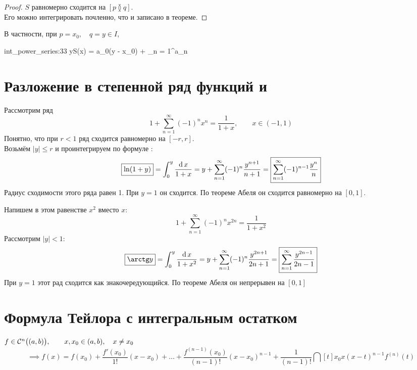 \begin{proof}
	$ S $ равномерно сходится на $ [p \between q] $. \\
	Его можно интегрировать почленно, что и записано в теореме.
\end{proof}

\begin{statement}
	В частности, при $ p = x_0, \quad q = y \in I $,
	\begin{equ}{int_power_series:33}
		y{S(x)} = a_0(y - x_0) + \sum_{n = 1}^\infty a_n 
	\end{equ}
\end{statement}

\section{Разложение в степенной ряд функций  и }

Рассмотрим ряд
$$ 1 + \sum_{n = 1}^\infty (-1)^nx^n = \frac1{1 + x}, \qquad x \in (-1, 1) $$
Понятно, что при $ r < 1 $ ряд сходится равномерно на $ [-r, r] $. \\
Возьмём $ |y| \le r $ и проинтегрируем по формуле :
$$ \boxed{\ln (1 + y)} = \dfint0y{1 + x} = y + \sum_{n = 1}^\infty (-1)^n \frac{y^{n + 1}}{n + 1} = \boxed{\sum_{n = 1}^\infty (-1)^{n - 1} \frac{y^n}n} $$
Радиус сходимости этого ряда равен 1. При $ y = 1 $ он сходится. По теореме Абеля он сходится равномерно на $ [0, 1] $.

Напишем в этом равенстве $ x^2 $ вместо $ x $:
$$ 1 + \sum_{n = 1}^\infty (-1)^n x^{2n} = \frac1{1 + x^2} $$
Рассмотрим $ |y| < 1 $:
$$ \boxed{\arctg y} = \dfint0y{1 + x^2} = y + \sum_{n = 1}^\infty (-1)^n \frac{y^{2n + 1}}{2n + 1} = \boxed{\sum_{n = 1}^\infty \frac{y^{2n - 1}}{2n - 1}} $$
При $ y = 1 $ этот рад сходится как знакочередующийся. По теореме Абеля он непрерывен на $ [0, 1] $

\section{Формула Тейлора с интегральным остатком}

\begin{theorem}
	$ f \in \Cont[n]{(a, b)}, \qquad x, x_0 \in (a, b), \quad x \ne x_0 $
	$$ \implies f(x) = f(x_0) + \frac{f'(x_0)}{1!}(x - x_0) + \dots + \frac{f^{(n - 1)}(x_0)}{(n - 1)!}(x - x_0)^{n - 1} + \frac1{(n - 1)!} \dint[t]{x_0}x{(x - t)^{n - 1}f^{(n)}(t)} $$
\end{theorem}

